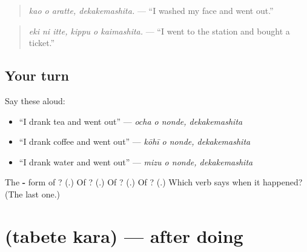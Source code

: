 \begin{quote}
\textbf{ }
\end{quote}

\begin{quote}
\emph{kao o aratte, dekakemashita.} — \textquotedblleft{}I washed my face and went out.\textquotedblright{}
\end{quote}

\begin{quote}
\textbf{  }
\end{quote}

\begin{quote}
\emph{eki ni itte, kippu o kaimashita.} — \textquotedblleft{}I went to the station and bought a ticket.\textquotedblright{}
\end{quote}

\subsection*{Your turn}
Say these aloud:

\begin{itemize}
\raggedright
  \item \textquotedblleft{}I drank tea and went out\textquotedblright{} — \emph{ocha o nonde, dekakemashita}
  \item \textquotedblleft{}I drank coffee and went out\textquotedblright{} — \emph{kōhī o nonde, dekakemashita}
  \item \textquotedblleft{}I drank water and went out\textquotedblright{} — \emph{mizu o nonde, dekakemashita}
\end{itemize}

\begin{tcolorbox}[breakable,colback=teal!4,colframe=teal!35!black,title={Before you move on}]
The \textbf{-} form of \textbf{}? (\textbf{}.) Of \textbf{}? (\textbf{}.) Of \textbf{}? (\textbf{}.) Of \textbf{}? (\textbf{}.) Which verb says when it happened? (The last one.)
\end{tcolorbox}
\section[\texorpdfstring{\ja{たべてから} (tabete kara)}{たべてから (tabete kara)}]{ (tabete kara) — after doing}

\label{lesson:JA-C252-tabete-kara}




